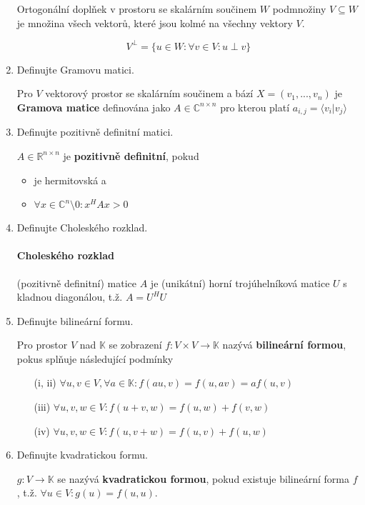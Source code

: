 \documentclass[10pt,a4paper]{article}
\theoremstyle{plain}
\theoremstyle{definition}
\begin{document}
\begin{enumerate}
Ortogonální doplňek v prostoru se skalárním součinem $W$ podmnožiny $V \subseteq W$ je množina všech vektorů, které jsou kolmé na všechny vektory $V$.

\[ V^\perp = \lbrace u \in W: \forall v \in V: u \perp v \rbrace \]

\item Definujte Gramovu matici.

Pro $V$ vektorový prostor se skalárním součinem a bází $X = (v_1, ..., v_n)$ je \textbf{Gramova matice} definována jako $A \in \mathbb{C}^{n \times n}$ pro kterou platí $a_{i,j} = \langle v_i | v_j \rangle$


\item Definujte pozitivně definitní matici.

$A \in \mathbb{R}^{n \times n}$ je \textbf{pozitivně definitní}, pokud
\begin{itemize}
\item je hermitovská a
\item $\forall x \in \mathbb{C}^n \setminus 0: x^HAx > 0$
\end{itemize}

\item Definujte Choleského rozklad.

\paragraph{Choleského rozklad} (pozitivně definitní) matice $A$ je (unikátní) horní trojúhelníková matice $U$ s kladnou diagonálou, t.ž. $A = U^HU$

\item Definujte bilineární formu.

Pro prostor $V$ nad $\mathbb{K}$ se zobrazení $f: V \times V \to \mathbb{K}$ nazývá \textbf{bilineární formou}, pokus splňuje následující podmínky 
\begin{enumerate}[label=(\roman*)]
\item[(i, ii)] $\forall u,v \in V, \forall a \in \mathbb{K}: f(au,v) = f(u,av) = af(u,v)$
\item[(iii)] $\forall u,v,w \in V : f(u+v,w) = f(u,w) + f(v,w)$
\item[(iv)] $\forall u,v,w \in V : f(u,v+w) = f(u,v) + f(u,w)$
\end{enumerate}

\item Definujte kvadratickou formu.

$g: V \to \mathbb{K}$ se nazývá \textbf{kvadratickou formou}, pokud existuje bilineární forma $f$, t.ž. $\forall u \in V: g(u) = f(u,u)$.


\end{enumerate}
\end{document}

